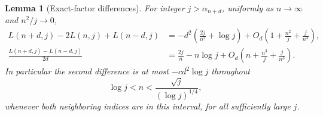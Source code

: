 \documentclass[11pt]{article}
\numberwithin{equation}{section}
\newtheorem{lemma}[theorem]{Lemma}
\theoremstyle{definition}
\begin{document}
\begin{lemma}[Exact-factor differences]\label{lem:jets_discrete_concavity}
For integer $j>\alpha_{n+d}$, uniformly as $n\to\infty$ and
$n^2/j\to0$,
\begin{align}
 L(n+d,j)-2L(n,j)+L(n-d,j)
 &=-d^2\left(\frac{2j}{n^2}+\log j\right)
       +O_d\left(1+\frac{n^2}{j}+\frac{j}{n^4}\right),
       \label{eq:jets_second_difference}\\
 \frac{L(n+d,j)-L(n-d,j)}{2d}
 &=\frac{2j}{n}-n\log j
       +O_d\left(n+\frac{n^3}{j}+\frac{j}{n^3}\right).
       \label{eq:jets_crossing_expansion}
\end{align}
In particular the second difference is at most $-cd^2\log j$
throughout
\begin{equation}\label{eq:jets_middle_window}
 \log j<n<\frac{\sqrt j}{(\log j)^{1/4}},
\end{equation}
whenever both neighboring indices are in this interval, for all
sufficiently large $j$.
\end{lemma}
\end{document}
